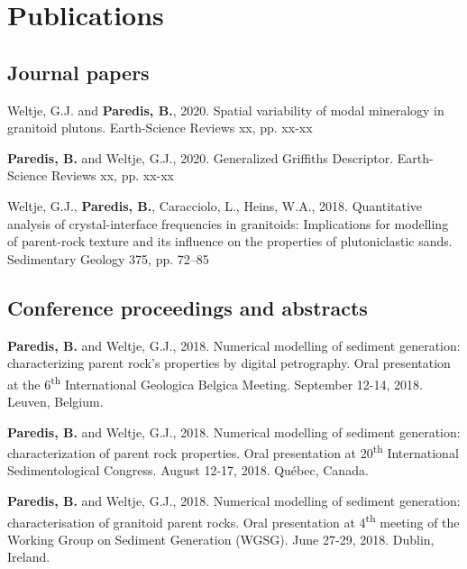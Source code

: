 \chapter*{Publications}\label{ch:publications}

\frenchspacing

\section*{Journal papers}

    Weltje, G.J. and \textbf{Paredis, B.}, %
    2020. %
    Spatial variability of modal mineralogy in granitoid plutons. %
    Earth-Science Reviews xx, %
    pp. xx-xx %

    \textbf{Paredis, B.} and Weltje, G.J., %
    2020. %
    Generalized Griffiths Descriptor. %
    Earth-Science Reviews xx, %
    pp. xx-xx %

    Weltje, G.J., \textbf{Paredis, B.}, Caracciolo, L., Heins, W.A., %
    2018. %
    Quantitative analysis of crystal-interface frequencies in granitoids: Implications for modelling of parent-rock texture and its influence on the properties of plutoniclastic sands. %
    Sedimentary Geology 375, %
    pp. 72–85 %


\section*{Conference proceedings and abstracts}

    \textbf{Paredis, B.} and Weltje, G.J., %
    2018. %
    Numerical modelling of sediment generation: characterizing parent rock’s properties by digital petrography. %
    Oral presentation at the 6\textsuperscript{th} International Geologica Belgica Meeting. %
    September 12-14, 2018. %
    Leuven, Belgium. %

    \textbf{Paredis, B.} and Weltje, G.J., %
    2018. %
    Numerical modelling of sediment generation: characterization of parent rock properties. %
    Oral presentation at 20\textsuperscript{th} International Sedimentological Congress. %
    August 12-17, 2018. %
    Québec, Canada. %

    \textbf{Paredis, B.} and Weltje, G.J., %
    2018. %
    Numerical modelling of sediment generation: characterisation of granitoid parent rocks. %
    Oral presentation at 4\textsuperscript{th} meeting of the Working Group on Sediment Generation (WGSG). %
    June 27-29, 2018. %
    Dublin, Ireland. %

